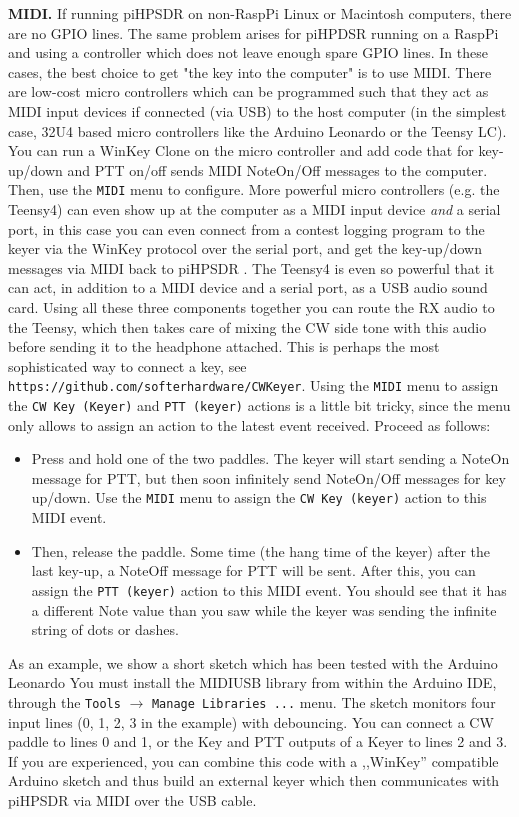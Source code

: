\documentclass[12pt]{book}
\def\bltt#1{\texttt{\color{blue}#1}}
\def\pH{pi\-HPSDR }
\begin{document}
\textbf{MIDI.}
If running \pH on non-RaspPi Linux or Macintosh computers, there are no GPIO
lines. The same problem arises for piHPDSR running on a RaspPi and using a controller
which does not leave enough spare GPIO lines. In these cases, the best
choice to get "the key into the computer" is to use MIDI. There are low-cost
micro controllers which can be programmed such that they act as MIDI input devices
if connected (via USB) to the host computer (in the simplest case, 32U4 based
micro controllers like the Arduino Leonardo or the Teensy LC). You can
run a WinKey Clone on the micro controller and add code that for key-up/down and
PTT on/off sends MIDI NoteOn/Off messages to the computer. Then, use the
\bltt{MIDI} menu to configure. More powerful micro controllers (e.g. the Teensy4)
can even show up at the computer as a MIDI input device \textit{and} a serial port,
in this case you can even connect from a contest logging program to  the keyer
via the WinKey protocol over the serial port, and get the key-up/down messages
via MIDI back to \pH. The Teensy4 is even so powerful that it can act, in
addition to a MIDI device and a serial port, as a USB audio sound card.
Using all these three components together you can route the RX audio to the
Teensy, which then takes care of mixing the CW side tone with this audio
before sending it to the headphone attached. This is perhaps the most
sophisticated way to connect a key, see \texttt{https://github.com/softerhardware/CWKeyer}.
Using the \bltt{MIDI} menu to assign the \bltt{CW Key (Keyer)} and \bltt{PTT (keyer)}
actions is a little bit tricky, since the menu only allows to assign an action to
the latest event received. Proceed as follows:

\begin{itemize}
\item{Press and hold one of the two paddles. The keyer will start sending a NoteOn
message for PTT, but then soon infinitely send NoteOn/Off messages for key up/down.
Use the \bltt{MIDI} menu to assign the \bltt{CW Key (keyer)} action to this MIDI event.}
\item{Then, release the paddle. Some time (the hang time of the keyer) after the last
key-up, a NoteOff message for PTT will be sent. After this, you can assign the
\bltt{PTT (keyer)} action to this MIDI event. You should see that it has a different
Note value than you saw while the keyer was sending the infinite string of dots or
dashes.}
\end{itemize}

As an example, we show a short sketch which has been tested with the Arduino Leonardo
You must install the MIDIUSB library from within the Arduino IDE, through the
\texttt{Tools} $\to$ \texttt{Manage Libraries ...}  menu. The sketch monitors four
input lines (0, 1, 2, 3 in the example) with debouncing. You can connect a CW paddle
to lines 0 and 1, or the Key and PTT outputs of a Keyer to lines 2 and 3.
If you are experienced, you can combine this code with a ,,WinKey'' compatible
Arduino sketch and thus build an external keyer which then communicates with \pH
via MIDI over the USB cable.
\end{document}
